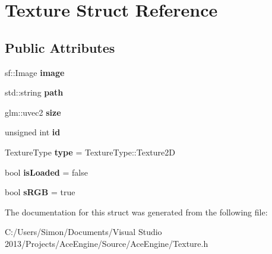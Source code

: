 \hypertarget{struct_texture}{}\section{Texture Struct Reference}
\label{struct_texture}
\subsection*{Public Attributes}
\begin{DoxyCompactItemize}
\item 
\hypertarget{struct_texture_aca5a94887081662571f71c113a50da90}{}sf\+::\+Image {\bfseries image}\label{struct_texture_aca5a94887081662571f71c113a50da90}

\item 
\hypertarget{struct_texture_aa8ba4ade408b0df1fc9b6f605a4efd22}{}std\+::string {\bfseries path}\label{struct_texture_aa8ba4ade408b0df1fc9b6f605a4efd22}

\item 
\hypertarget{struct_texture_ab1c2077cdc453d9a42505975d1cd4daa}{}glm\+::uvec2 {\bfseries size}\label{struct_texture_ab1c2077cdc453d9a42505975d1cd4daa}

\item 
\hypertarget{struct_texture_aed42161a5c00b6020c85833401da6da6}{}unsigned int {\bfseries id}\label{struct_texture_aed42161a5c00b6020c85833401da6da6}

\item 
\hypertarget{struct_texture_ad83ed086abaa805a606a5ccd433f505c}{}Texture\+Type {\bfseries type} = Texture\+Type\+::\+Texture2\+D\label{struct_texture_ad83ed086abaa805a606a5ccd433f505c}

\item 
\hypertarget{struct_texture_a0f7ade2abc1ccc6611e9beba8e94c1d9}{}bool {\bfseries is\+Loaded} = false\label{struct_texture_a0f7ade2abc1ccc6611e9beba8e94c1d9}

\item 
\hypertarget{struct_texture_a953b0a91e64cb9cc7cf25b52485c7929}{}bool {\bfseries s\+R\+G\+B} = true\label{struct_texture_a953b0a91e64cb9cc7cf25b52485c7929}

\end{DoxyCompactItemize}


The documentation for this struct was generated from the following file\+:\begin{DoxyCompactItemize}
\item 
C\+:/\+Users/\+Simon/\+Documents/\+Visual Studio 2013/\+Projects/\+Ace\+Engine/\+Source/\+Ace\+Engine/Texture.\+h\end{DoxyCompactItemize}
